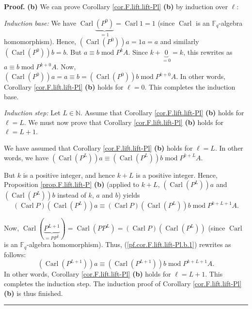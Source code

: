 \documentclass[numbers=enddot,12pt,final,onecolumn,notitlepage]{scrartcl}%
\theoremstyle{definition}
\newenvironment{proof}[1][Proof]{\noindent\textbf{#1.} }{\ \rule{0.5em}{0.5em}}
\begin{document}
\begin{proof}
\textbf{(b)} We can prove Corollary \ref{cor.F.lift.lift-Pl} \textbf{(b)} by
induction over $\ell$:

\textit{Induction base:} We have $\operatorname*{Carl}\underbrace{\left(
P^{0}\right)  }_{=1}=\operatorname*{Carl}1=1$ (since $\operatorname*{Carl}$ is
an $\mathbb{F}_{q}$-algebra homomorphism). Hence, $\left(
\operatorname*{Carl}\left(  P^{0}\right)  \right)  a=1a=a$ and similarly
$\left(  \operatorname*{Carl}\left(  P^{0}\right)  \right)  b=b$. But $a\equiv
b\operatorname{mod}P^{k}A$. Since $k+\underbrace{0}_{=0}=k$, this rewrites as
$a\equiv b\operatorname{mod}P^{k+0}A$. Now, $\left(  \operatorname*{Carl}%
\left(  P^{0}\right)  \right)  a=a\equiv b=\left(  \operatorname*{Carl}\left(
P^{0}\right)  \right)  b\operatorname{mod}P^{k+0}A$. In other words, Corollary
\ref{cor.F.lift.lift-Pl} \textbf{(b)} holds for $\ell=0$. This completes the
induction base.

\textit{Induction step:} Let $L\in\mathbb{N}$. Assume that Corollary
\ref{cor.F.lift.lift-Pl} \textbf{(b)} holds for $\ell=L$. We must now prove
that Corollary \ref{cor.F.lift.lift-Pl} \textbf{(b)} holds for $\ell=L+1$.

We have assumed that Corollary \ref{cor.F.lift.lift-Pl} \textbf{(b)} holds for
$\ell=L$. In other words, we have $\left(  \operatorname*{Carl}\left(
P^{L}\right)  \right)  a\equiv\left(  \operatorname*{Carl}\left(
P^{L}\right)  \right)  b\operatorname{mod}P^{k+L}A$.

But $k$ is a positive integer, and hence $k+L$ is a positive integer. Hence,
Proposition \ref{prop.F.lift.lift-P} \textbf{(b)} (applied to $k+L$, $\left(
\operatorname*{Carl}\left(  P^{L}\right)  \right)  a$ and $\left(
\operatorname*{Carl}\left(  P^{L}\right)  \right)  b$ instead of $k$, $a$ and
$b$) yields
\begin{equation}
\left(  \operatorname*{Carl}P\right)  \left(  \operatorname*{Carl}\left(
P^{L}\right)  \right)  a\equiv\left(  \operatorname*{Carl}P\right)  \left(
\operatorname*{Carl}\left(  P^{L}\right)  \right)  b\operatorname{mod}%
P^{k+L+1}A. \label{pf.cor.F.lift.lift-Pl.b.1}%
\end{equation}


Now, $\operatorname*{Carl}\left(  \underbrace{P^{L+1}}_{=PP^{L}}\right)
=\operatorname*{Carl}\left(  PP^{L}\right)  =\left(  \operatorname*{Carl}%
P\right)  \left(  \operatorname*{Carl}\left(  P^{L}\right)  \right)  $ (since
$\operatorname*{Carl}$ is an $\mathbb{F}_{q}$-algebra homomorphism). Thus,
(\ref{pf.cor.F.lift.lift-Pl.b.1}) rewrites as follows:%
\[
\left(  \operatorname*{Carl}\left(  P^{L+1}\right)  \right)  a\equiv\left(
\operatorname*{Carl}\left(  P^{L+1}\right)  \right)  b\operatorname{mod}%
P^{k+L+1}A.
\]
In other words, Corollary \ref{cor.F.lift.lift-Pl} \textbf{(b)} holds for
$\ell=L+1$. This completes the induction step. The induction proof of
Corollary \ref{cor.F.lift.lift-Pl} \textbf{(b)} is thus finished.
\end{proof}
\end{document}
